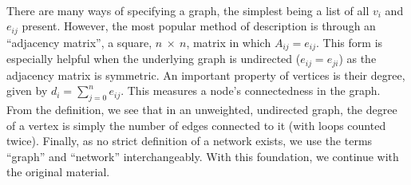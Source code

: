 \documentclass[11pt]{article}
\begin{document}
\\
There are many ways of specifying a graph, the simplest being a list of all $v_{i}$ and $e_{ij}$ present. However, the most popular method of description is through an ``adjacency matrix'', a square, $n \ \times \ n$, matrix in which $A_{ij}=e_{ij}$. This form is especially helpful when the underlying graph is undirected ($e_{ij}=e_{ji}$) as the adjacency matrix is symmetric. An important property of vertices is their degree, given by $d_{i}=\sum\limits_{j=0}^n e_{ij}$. This measures a node's connectedness in the graph. From the definition, we see that in an unweighted, undirected graph, the degree of a vertex is simply the number of edges connected to it (with loops counted twice). Finally, as no strict definition of a network exists, we use the terms ``graph'' and ``network'' interchangeably. With this foundation, we continue with the original material.
\end{document}
